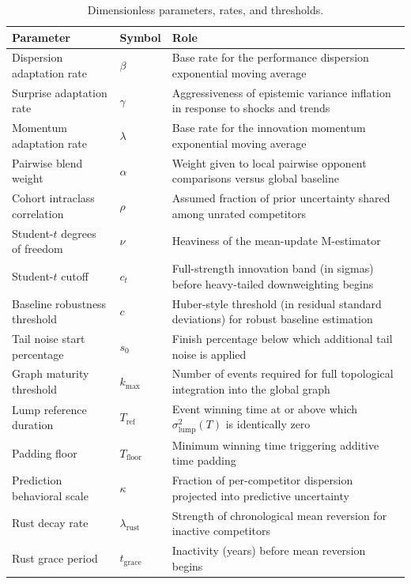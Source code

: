 \documentclass[12pt]{article}
\newcommand{\slump}{\sigma_{\mathrm{lump}}^2}  %
\newcommand{\tref}{T_{\mathrm{ref}}}
\newcommand{\tfloor}{T_{\mathrm{floor}}}
\newcommand{\betad}{\beta}      %
\newcommand{\gammad}{\gamma}    %
\newcommand{\lambdad}{\lambda}  %
\newcommand{\alphad}{\alpha}    %
\newcommand{\rhoc}{\rho}        %
\newcommand{\nudof}{\nu}       %
\newcommand{\ctcut}{c_t}       %
\newcommand{\cthresh}{c}        %
\newcommand{\kmax}{k_{\mathrm{max}}}
\newcommand{\kappap}{\kappa}    %
\newcommand{\lambdar}{\lambda_{\mathrm{rust}}}
\newcommand{\tgrace}{t_{\mathrm{grace}}}
\begin{document}
	\begin{table}[htbp]
		\centering
		\caption{Dimensionless parameters, rates, and thresholds.}
		\label{tab:params-dimensionless}
		\begin{tabular}{llp{7cm}}
			\toprule
			\textbf{Parameter} & \textbf{Symbol} & \textbf{Role} \\
			\midrule
			Dispersion adaptation rate & \(\betad\) & Base rate for the performance dispersion exponential moving average \\
			Surprise adaptation rate & \(\gammad\) & Aggressiveness of epistemic variance inflation in response to shocks and trends \\
			Momentum adaptation rate & \(\lambdad\) & Base rate for the innovation momentum exponential moving average \\
			Pairwise blend weight & \(\alphad\) & Weight given to local pairwise opponent comparisons versus global baseline \\
			Cohort intraclass correlation & \(\rhoc\) & Assumed fraction of prior uncertainty shared among unrated competitors \\
			Student-$t$ degrees of freedom & \(\nudof\) & Heaviness of the mean-update M-estimator \\
			Student-$t$ cutoff & \(\ctcut\) & Full-strength innovation band (in sigmas) before heavy-tailed downweighting begins \\
			Baseline robustness threshold & \(\cthresh\) & Huber-style threshold (in residual standard deviations) for robust baseline estimation \\
			Tail noise start percentage & \(s_0\) & Finish percentage below which additional tail noise is applied \\
			Graph maturity threshold & \(\kmax\) & Number of events required for full topological integration into the global graph \\
			Lump reference duration & \(\tref\) & Event winning time at or above which \(\slump(T)\) is identically zero \\
			Padding floor & \(\tfloor\) & Minimum winning time triggering additive time padding \\
			Prediction behavioral scale & \(\kappap\) & Fraction of per-competitor dispersion projected into predictive uncertainty \\
			Rust decay rate & \(\lambdar\) & Strength of chronological mean reversion for inactive competitors \\
			Rust grace period & \(\tgrace\) & Inactivity (years) before mean reversion begins \\
			\bottomrule
		\end{tabular}
	\end{table}
\end{document}
